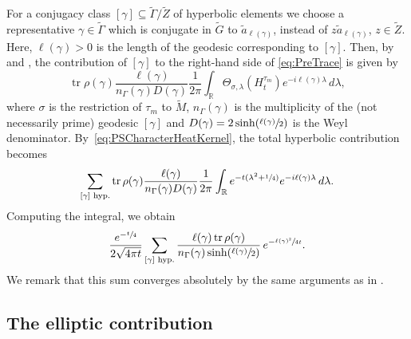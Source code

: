 \documentclass[JEP,XML,SOM,Unicode,NoFloatCountersInSection,published]{cedram}
\theoremstyle{plain}
\theoremstyle{definition}
\theoremstyle{remark}
\newcommand{\R}{\mathbb{R}}
\DeclareMathOperator{\tr}{tr}
\numberwithin{equation}{section}
\begin{document}
For a conjugacy class $[\gamma]\subseteq\widetilde{\Gamma}/\widetilde{Z}$ of hyperbolic elements we choose a representative $\gamma\in\widetilde{\Gamma}$ which is conjugate in $\widetilde{G}$ to $\widetilde{a}_{\ell(\gamma)}$, instead of $z\widetilde{a}_{\ell(\gamma)}$, $z\in\widetilde{Z}$.
Here, $\ell(\gamma)>0$ is the length of the geodesic corresponding to $[\gamma]$. Then, by \cite[Lem.\,2]{Hof94} and \cite[\S 6]{Wa}, the contribution of $[\gamma]$ to the right-hand side of \cref{eq:PreTrace} is given by
\[
\tr\rho(\gamma)\frac{\ell(\gamma)}{n_\Gamma(\gamma)D(\gamma)}\frac{1}{2\pi}\int_\R \Theta_{\sigma,\lambda}(H_t^{\tau_m})e^{-i\ell(\gamma)\lambda}\,d\lambda,
\]
where $\sigma$ is the restriction of $\tau_m$ to $\widetilde{M}$, $n_{\Gamma}(\gamma)$ is the multiplicity of the (not necessarily prime) geodesic $[\gamma]$ and $D(\gamma) = 2 \sinh(\sfrac {\ell(\gamma)} 2)$ is the Weyl denominator.
By~\cref{eq:PSCharacterHeatKernel}, the total hyperbolic contribution becomes
\[
\sum_{[\gamma]\textup{ hyp.}}\tr\rho(\gamma)\frac{\ell(\gamma)}{n_\Gamma(\gamma)D(\gamma)}\frac{1}{2\pi}\int_\R e^{-t(\lambda^2+\sfrac{1}{4})}e^{-i\ell(\gamma)\lambda}\,d\lambda.
\]
Computing the integral,
we obtain
\[
\frac{e^{-\sfrac{t}{4}}}{2\sqrt{4\pi t}}\sum_{[\gamma]\textup{ hyp.}}\frac{\ell(\gamma)\tr\rho(\gamma)}{n_\Gamma(\gamma)\sinh(\sfrac{\ell(\gamma)}{2})}\,e^{-\sfrac{\ell(\gamma)^2}{4t}}.
\]
We remark that this sum converges absolutely by the same arguments as in \cite[Prop.\,4.1.1]{FS}.

\subsection{The elliptic contribution}
\label{subsec:ell}
\end{document}
